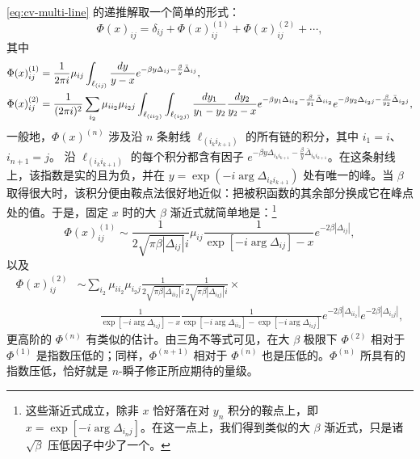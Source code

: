 \eqref{eq:cv-multi-line} 的递推解取一个简单的形式：
\begin{equation}\label{eq:appC-Phi-series}
\Phi(x)_{ij} = \delta_{ij} + \Phi(x)_{ij}^{(1)} + \Phi(x)_{ij}^{(2)} + \cdots,
\end{equation}
其中
\begin{align}
\Phi(x)_{ij}^{(1)} &= \frac{1}{2 \pi i} \mu_{ij}
\int_{\ell_{(ij)}} \frac{dy}{y-x} e^{ -\beta y
\Delta_{ij} - \frac{\beta}{y} \bar \Delta_{ij} }, \label{eq:appC-Phi12}\\
\Phi(x)_{ij}^{(2)} &= \frac{1}{(2 \pi i)^2} \sum_{i_2} \mu_{i i_2} \mu_{i_2 j}
\int_{\ell_{(i i_2)}} \int_{\ell_{(i_2 j)}} \frac{dy_1}{y_1-y_2}
\frac{dy_2}{y_2-x}e^{ -\beta
y_1 \Delta_{i i_2} - \frac{\beta}{y_1} \bar \Delta_{i i_2} }e^{ -\beta
y_2 \Delta_{i_2 j} - \frac{\beta}{y_2} \bar \Delta_{i_2 j} }, \notag
\end{align}
一般地，$\Phi(x)^{(n)}$ 涉及沿 $n$ 条射线 $\ell_{(i_k i_{k+1})}$ 的所有链的积分，其中 $i_1 = i$、$i_{n+1} = j$。
沿 $\ell_{(i_k i_{k+1})}$ 的每个积分都含有因子 $e^{ - \beta y \Delta_{i_k i_{k+1}} - \frac{\beta}{y} \bar \Delta_{i_k i_{k+1}} }$。在这条射线上，该指数是实的且为负，并在 $y = \exp (-i \arg \Delta_{i_k i_{k+1}})$ 处有唯一的峰。当 $\beta$ 取得很大时，该积分便由鞍点法很好地近似：把被积函数的其余部分换成它在峰点处的值。于是，固定 $x$ 时的大 $\beta$ 渐近式就简单地是：\footnote{这些渐近式成立，除非 $x$ 恰好落在对 $y_n$ 积分的鞍点上，即 $x = \exp [-i \arg \Delta_{i_n j}]$。在这一点上，我们得到类似的大 $\beta$ 渐近式，只是诸 $\sqrt{\beta}$ 压低因子中少了一个。}
\begin{equation}\label{eq:appC-asym1}
\Phi(x)^{(1)}_{ij}  \sim \frac{1}{2 \sqrt{\pi \beta |\Delta_{ij}|} i}
\mu_{ij}\frac{1}{\exp[-i \arg \Delta_{ij}]-x} e^{- 2 \beta
|\Delta_{ij}|},
\end{equation}
以及
\begin{equation}\label{eq:appC-asym2}
\begin{aligned}
\Phi(x)^{(2)}_{ij} &\sim \sum_{i_2} \mu_{i i_2} \mu_{i_2 j} \frac{1}{2 \sqrt{\pi \beta
|\Delta_{i i_2}|} i}\frac{1}{2 \sqrt{\pi \beta |\Delta_{i_2 j}|} i} \times \\
&\qquad \frac{1}{\exp[-i \arg \Delta_{i_2 j}]-x}\frac{1}{\exp[-i \arg
\Delta_{i i_2}]-\exp[-i \arg \Delta_{i_2 j}]}e^{- 2 \beta |\Delta_{i
i_2}|}e^{- 2 \beta |\Delta_{i_2 j}|},
\end{aligned}
\end{equation}
更高阶的 $\Phi^{(n)}$ 有类似的估计。由三角不等式可见，在大 $\beta$ 极限下 $\Phi^{(2)}$ 相对于 $\Phi^{(1)}$ 是指数压低的；同样，$\Phi^{(n+1)}$ 相对于 $\Phi^{(n)}$ 也是压低的。$\Phi^{(n)}$ 所具有的指数压低，恰好就是 $n$-瞬子修正所应期待的量级。

